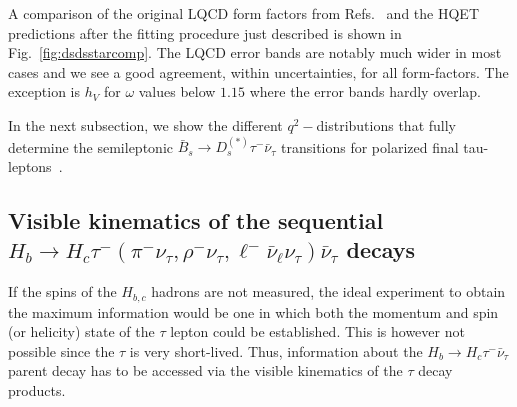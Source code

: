 \documentclass[aps,superscriptaddress,showpacs,nofootinbib,11pt]{revtex4-1}
\begin{document}
A comparison of the original LQCD form factors from Refs.~\cite{McLean:2019qcx,Harrison:2023dzh} and the HQET predictions after the fitting procedure just described is shown in  Fig.~\ref{fig:dsdsstarcomp}. The LQCD error bands are notably much wider in most cases and we see a good agreement, within uncertainties, for all form-factors. The exception is  $h_V$ for $\omega$ values below $1.15$ where the error bands hardly overlap.



In the next subsection, we show the different $q^2-$distributions that fully determine the semileptonic $\bar B_s \to D^{(*)}_s\tau^-\bar\nu_\tau$ transitions for polarized final tau-leptons~\cite{Penalva:2021gef,Penalva:2021wye}. 

\subsection{Visible kinematics of the sequential 
$H_b\to H_c\tau^-(\pi^-\nu_\tau,\rho^-\nu_\tau,\ell^-\bar\nu_\ell\nu_\tau)\bar\nu_\tau$ decays}
\label{sec:assy}
%
If the spins of the $H_{b,c}$ hadrons are not measured, the ideal experiment to obtain the maximum information would be one in which both the momentum and spin (or helicity) state of the $\tau$ lepton could be established. This is however not possible since the $\tau$ is very short-lived. Thus, information about the $H_b\to H_c\tau^-\bar\nu_\tau$ parent decay has to be accessed via the visible kinematics of the $\tau$ decay products. 
\end{document}
